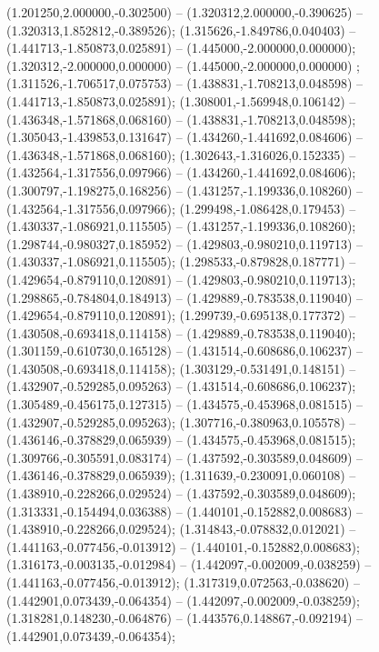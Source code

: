  (1.201250,2.000000,-0.302500) -- (1.320312,2.000000,-0.390625) -- (1.320313,1.852812,-0.389526);
 (1.315626,-1.849786,0.040403) -- (1.441713,-1.850873,0.025891) -- (1.445000,-2.000000,0.000000);
 (1.320312,-2.000000,0.000000) -- (1.445000,-2.000000,0.000000) ;
 (1.311526,-1.706517,0.075753) -- (1.438831,-1.708213,0.048598) -- (1.441713,-1.850873,0.025891);
 (1.308001,-1.569948,0.106142) -- (1.436348,-1.571868,0.068160) -- (1.438831,-1.708213,0.048598);
 (1.305043,-1.439853,0.131647) -- (1.434260,-1.441692,0.084606) -- (1.436348,-1.571868,0.068160);
 (1.302643,-1.316026,0.152335) -- (1.432564,-1.317556,0.097966) -- (1.434260,-1.441692,0.084606);
 (1.300797,-1.198275,0.168256) -- (1.431257,-1.199336,0.108260) -- (1.432564,-1.317556,0.097966);
 (1.299498,-1.086428,0.179453) -- (1.430337,-1.086921,0.115505) -- (1.431257,-1.199336,0.108260);
 (1.298744,-0.980327,0.185952) -- (1.429803,-0.980210,0.119713) -- (1.430337,-1.086921,0.115505);
 (1.298533,-0.879828,0.187771) -- (1.429654,-0.879110,0.120891) -- (1.429803,-0.980210,0.119713);
 (1.298865,-0.784804,0.184913) -- (1.429889,-0.783538,0.119040) -- (1.429654,-0.879110,0.120891);
 (1.299739,-0.695138,0.177372) -- (1.430508,-0.693418,0.114158) -- (1.429889,-0.783538,0.119040);
 (1.301159,-0.610730,0.165128) -- (1.431514,-0.608686,0.106237) -- (1.430508,-0.693418,0.114158);
 (1.303129,-0.531491,0.148151) -- (1.432907,-0.529285,0.095263) -- (1.431514,-0.608686,0.106237);
 (1.305489,-0.456175,0.127315) -- (1.434575,-0.453968,0.081515) -- (1.432907,-0.529285,0.095263);
 (1.307716,-0.380963,0.105578) -- (1.436146,-0.378829,0.065939) -- (1.434575,-0.453968,0.081515);
 (1.309766,-0.305591,0.083174) -- (1.437592,-0.303589,0.048609) -- (1.436146,-0.378829,0.065939);
 (1.311639,-0.230091,0.060108) -- (1.438910,-0.228266,0.029524) -- (1.437592,-0.303589,0.048609);
 (1.313331,-0.154494,0.036388) -- (1.440101,-0.152882,0.008683) -- (1.438910,-0.228266,0.029524);
 (1.314843,-0.078832,0.012021) -- (1.441163,-0.077456,-0.013912) -- (1.440101,-0.152882,0.008683);
 (1.316173,-0.003135,-0.012984) -- (1.442097,-0.002009,-0.038259) -- (1.441163,-0.077456,-0.013912);
 (1.317319,0.072563,-0.038620) -- (1.442901,0.073439,-0.064354) -- (1.442097,-0.002009,-0.038259);
 (1.318281,0.148230,-0.064876) -- (1.443576,0.148867,-0.092194) -- (1.442901,0.073439,-0.064354);
